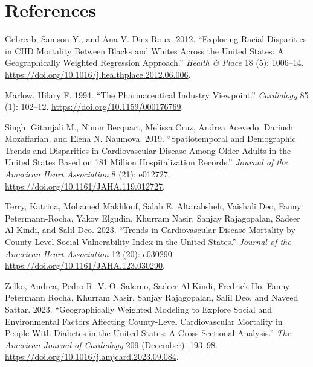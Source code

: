 \documentclass[
]{article}
\newlength{\cslhangindent}
\newenvironment{CSLReferences}[2] %
 {\begin{list}{}{%
  \setlength{\itemindent}{0pt}
  \setlength{\leftmargin}{0pt}
  \setlength{\parsep}{0pt}
  \ifodd #1
   \setlength{\leftmargin}{\cslhangindent}
   \setlength{\itemindent}{-1\cslhangindent}
  \fi
  \setlength{\itemsep}{#2\baselineskip}}}
 {\end{list}}
\begin{document}
\newpage{}

\section*{References}\label{references}

\label{refs}
\begin{CSLReferences}{1}{0}
Gebreab, Samson Y., and Ana V. Diez Roux. 2012. {``Exploring Racial
Disparities in {CHD} Mortality Between Blacks and Whites Across the
{United} {States}: {A} Geographically Weighted Regression Approach.''}
\emph{Health \& Place} 18 (5): 1006--14.
\url{https://doi.org/10.1016/j.healthplace.2012.06.006}.

Marlow, Hilary F. 1994. {``The Pharmaceutical Industry Viewpoint.''}
\emph{Cardiology} 85 (1): 102--12.
\url{https://doi.org/10.1159/000176769}.

Singh, Gitanjali M., Ninon Becquart, Melissa Cruz, Andrea Acevedo,
Dariush Mozaffarian, and Elena N. Naumova. 2019. {``Spatiotemporal and
{Demographic} {Trends} and {Disparities} in {Cardiovascular} {Disease}
{Among} {Older} {Adults} in the {United} {States} {Based} on 181
{Million} {Hospitalization} {Records}.''} \emph{Journal of the American
Heart Association} 8 (21): e012727.
\url{https://doi.org/10.1161/JAHA.119.012727}.

Terry, Katrina, Mohamed Makhlouf, Salah E. Altarabsheh, Vaishali Deo,
Fanny Petermann-Rocha, Yakov Elgudin, Khurram Nasir, Sanjay Rajagopalan,
Sadeer Al-Kindi, and Salil Deo. 2023. {``Trends in {Cardiovascular}
{Disease} {Mortality} by {County}-{Level} {Social} {Vulnerability}
{Index} in the {United} {States}.''} \emph{Journal of the American Heart
Association} 12 (20): e030290.
\url{https://doi.org/10.1161/JAHA.123.030290}.

Zelko, Andrea, Pedro R. V. O. Salerno, Sadeer Al-Kindi, Fredrick Ho,
Fanny Petermann Rocha, Khurram Nasir, Sanjay Rajagopalan, Salil Deo, and
Naveed Sattar. 2023. {``Geographically {Weighted} {Modeling} to
{Explore} {Social} and {Environmental} {Factors} {Affecting}
{County}-{Level} {Cardiovascular} {Mortality} in {People} {With}
{Diabetes} in the {United} {States}: {A} {Cross}-{Sectional}
{Analysis}.''} \emph{The American Journal of Cardiology} 209 (December):
193--98. \url{https://doi.org/10.1016/j.amjcard.2023.09.084}.

\end{CSLReferences}
\end{document}
